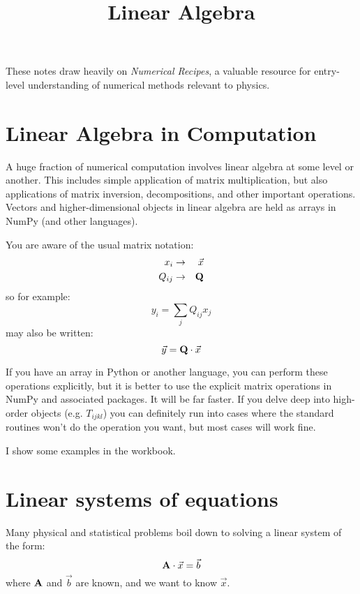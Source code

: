 \title{Linear Algebra}

These notes draw heavily on {\it Numerical Recipes}, a valuable
resource for entry-level understanding of numerical methods relevant
to physics.

\section{Linear Algebra in Computation}

A huge fraction of numerical computation involves linear algebra at
some level or another. This includes simple application of matrix
multiplication, but also applications of matrix inversion,
decompositions, and other important operations.  Vectors and
higher-dimensional objects in linear algebra are held as arrays in
NumPy (and other languages).

You are aware of the usual matrix notation:
\begin{eqnarray}
x_i &\rightarrow& \vec{x} \cr
Q_{ij} &\rightarrow& {\bf Q}
\end{eqnarray}
so for example:
\begin{equation}
y_i = \sum_j Q_{ij} x_j
\end{equation}
may also be written:
\begin{equation}
\vec{y} = {\bf Q}\cdot \vec{x}
\end{equation}

If you have an array in Python or another language, you can perform
these operations explicitly, but it is better to use the explicit
matrix operations in NumPy and associated packages. It will be far
faster. If you delve deep into high-order objects (e.g. $T_{ijkl}$)
you can definitely run into cases where the standard routines won't do
the operation you want, but most cases will work fine.

I show some examples in the workbook.

\section{Linear systems of equations}

Many physical and statistical problems boil down to solving a linear
system of the form:
\begin{equation}
{\bf A} \cdot \vec{x} = \vec{b}
\end{equation}
where ${\bf A}$ and $\vec{b}$ are known, and we want to know
$\vec{x}$.


